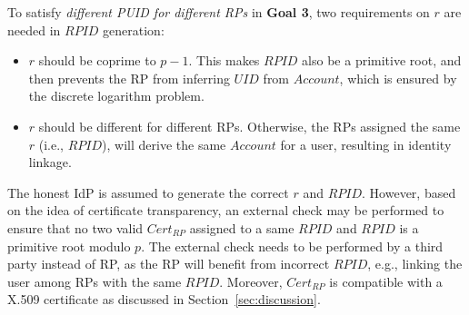 To satisfy \emph{different PUID for different RPs} in \textbf{Goal 3}, two requirements on $r$ are needed  in $RPID$ generation:  
\begin{itemize}
  \item $r$ should be coprime to $p-1$. This makes $RPID$ also be  a primitive root, and then prevents the RP from inferring $UID$ from $Account$, which is  ensured by the discrete logarithm problem.
  
  \item  $r$ should be different for different RPs. Otherwise, the RPs assigned the same $r$ (i.e., $RPID$), will derive the same $Account$ for a user, resulting in identity linkage. %
\end{itemize}

The honest IdP is assumed to generate the correct $r$ and $RPID$. 
However, based on the idea of certificate transparency, 
an external check may be performed to ensure that  no two valid $Cert_{RP}$ assigned to a same $RPID$ and $RPID$ is a primitive root modulo $p$.
The external check needs to be performed by a third party instead of RP, as the RP will benefit from incorrect $RPID$, e.g., linking the user among RPs with the same  $RPID$.
Moreover, $Cert_{RP}$ is compatible with a X.509 certificate as discussed in Section~\ref{sec:discussion}.




